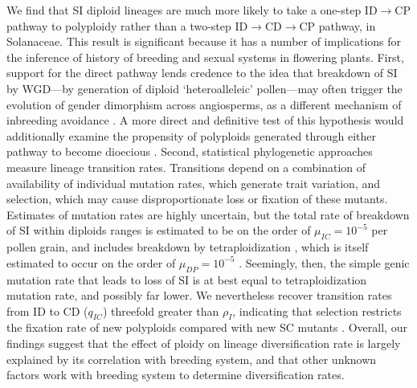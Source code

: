 We find that SI diploid lineages are much more likely to take a one-step  ID$\rightarrow$CP pathway to polyploidy rather than a two-step ID$\rightarrow$CD$\rightarrow$CP pathway, in Solanaceae.
This result is significant because it has a number of implications for the inference of history of breeding and sexual systems in flowering plants.
First, support for the direct pathway lends credence to the idea that breakdown of SI by WGD---by generation of diploid `heteroalleleic' pollen---may often trigger the evolution of gender dimorphism across angiosperms, as a different mechanism of inbreeding avoidance \citep{miller_2000}.
A more direct and definitive test of this hypothesis would additionally examine the propensity of polyploids generated through either pathway to become dioecious \citep{robertson_2011}.
Second, statistical phylogenetic approaches measure lineage transition rates.
Transitions depend on a combination of availability of individual mutation rates, which generate trait variation, and selection, which may cause disproportionate loss or fixation of these mutants.
Estimates of mutation rates are highly uncertain, but the total rate of breakdown of SI within diploids ranges is estimated to be on the order of  $\mu_{IC} = 10^{-5}$ per pollen grain, and includes breakdown by tetraploidization \citep{lewis1979}, which is itself estimated to occur on the order of $\mu_{DP} = 10^{-5}$ \citep{ramsey_1998}. 
Seemingly, then, the simple genic mutation rate that leads to loss of SI is at best equal to tetraploidization mutation rate, and possibly far lower.
We nevertheless recover transition rates from ID to CD ($q_{IC}$) threefold greater than $\rho_{I}$, indicating that selection restricts the fixation rate of new polyploids compared with new SC mutants \citep{robertson_2011}.
Overall, our findings suggest that the effect of ploidy on lineage diversification rate is largely explained by its correlation with breeding system, and that other unknown factors work with breeding system to determine diversification rates.

